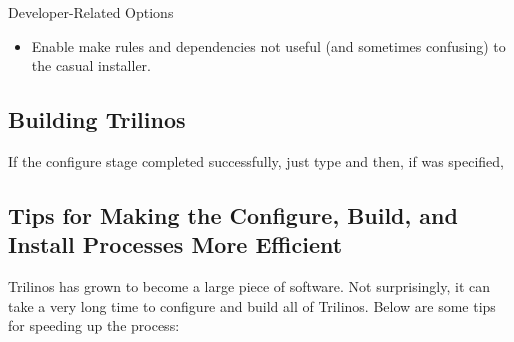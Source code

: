 Developer-Related Options
\begin{itemize}
\item {}

Enable make rules and dependencies not useful (and sometimes confusing) to 
the casual installer.
\end{itemize}

\subsection{Building Trilinos}

If the configure stage completed successfully, just type 
 and then, if 
 was specified, 

\subsection{Tips for Making the Configure, Build, and Install Processes More Efficient}

Trilinos has grown to become a large piece of software.  Not surprisingly,
it can take a very long time to configure and build all of Trilinos.  Below 
are some tips for speeding up the process:

